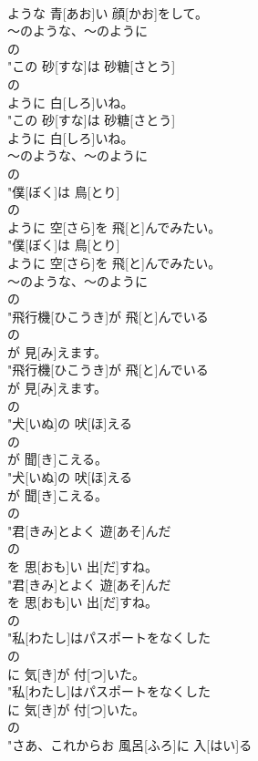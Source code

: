 \documentclass[8pt]{extreport}
\begin{document}
\begin{CJK}{UTF8}{min}
\\	ような 青[あお]い 顔[かお]をして。
\\	～のような、～のように	
\\	の
\\	"この 砂[すな]は 砂糖[さとう]
\\	の
\\	ように 白[しろ]いね。
\\	"この 砂[すな]は 砂糖[さとう]
\\	ように 白[しろ]いね。
\\	～のような、～のように	
\\	の
\\	"僕[ぼく]は 鳥[とり]
\\	の
\\	ように 空[さら]を 飛[と]んでみたい。
\\	"僕[ぼく]は 鳥[とり]
\\	ように 空[さら]を 飛[と]んでみたい。
\\	～のような、～のように	
\\	の
\\	"飛行機[ひこうき]が 飛[と]んでいる
\\	の
\\	が 見[み]えます。
\\	"飛行機[ひこうき]が 飛[と]んでいる
\\	が 見[み]えます。
\\	の
\\	"犬[いぬ]の 吠[ほ]える
\\	の
\\	が 聞[き]こえる。
\\	"犬[いぬ]の 吠[ほ]える
\\	が 聞[き]こえる。
\\	の
\\	"君[きみ]とよく 遊[あそ]んだ
\\	の
\\	を 思[おも]い 出[だ]すね。
\\	"君[きみ]とよく 遊[あそ]んだ
\\	を 思[おも]い 出[だ]すね。
\\	の
\\	"私[わたし]はパスポートをなくした
\\	の
\\	に 気[き]が 付[つ]いた。
\\	"私[わたし]はパスポートをなくした
\\	に 気[き]が 付[つ]いた。
\\	の
\\	"さあ、これからお 風呂[ふろ]に 入[はい]る

\end{CJK}
\end{document}
